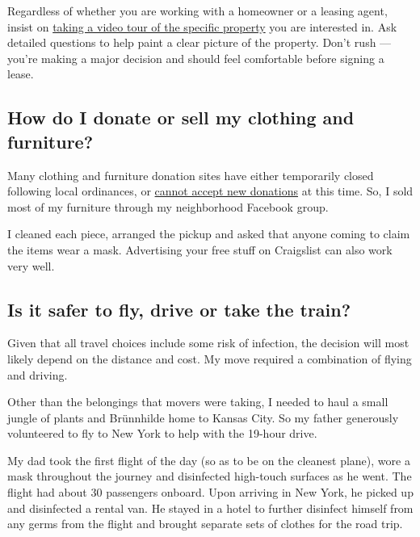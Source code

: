 Regardless of whether you are working with a homeowner or a leasing
agent, insist on
\href{https://www.nytimes3xbfgragh.onion/2020/05/30/realestate/virtual-tours-renting.html}{taking
a video tour of the specific property} you are interested in. Ask
detailed questions to help paint a clear picture of the property. Don't
rush --- you're making a major decision and should feel comfortable
before signing a lease.

\hypertarget{how-do-i-donate-or-sell-my-clothing-and-furniture}{%
\subsection{How do I donate or sell my clothing and
furniture?}\label{how-do-i-donate-or-sell-my-clothing-and-furniture}}

Many clothing and furniture donation sites have either temporarily
closed following local ordinances, or
\href{https://www.nytimes3xbfgragh.onion/2020/04/13/style/self-care/donate-clothes-coronavirus.html}{cannot
accept new donations} at this time. So, I sold most of my furniture
through my neighborhood Facebook group.

I cleaned each piece, arranged the pickup and asked that anyone coming
to claim the items wear a mask. Advertising your free stuff on
Craigslist can also work very well.

\hypertarget{is-it-safer-to-fly-drive-or-take-the-train}{%
\subsection{Is it safer to fly, drive or take the
train?}\label{is-it-safer-to-fly-drive-or-take-the-train}}

Given that all travel choices include some risk of infection, the
decision will most likely depend on the distance and cost. My move
required a combination of flying and driving.

Other than the belongings that movers were taking, I needed to haul a
small jungle of plants and Brünnhilde home to Kansas City. So my father
generously volunteered to fly to New York to help with the 19-hour
drive.

My dad took the first flight of the day (so as to be on the cleanest
plane), wore a mask throughout the journey and disinfected high-touch
surfaces as he went. The flight had about 30 passengers onboard. Upon
arriving in New York, he picked up and disinfected a rental van. He
stayed in a hotel to further disinfect himself from any germs from the
flight and brought separate sets of clothes for the road trip.

